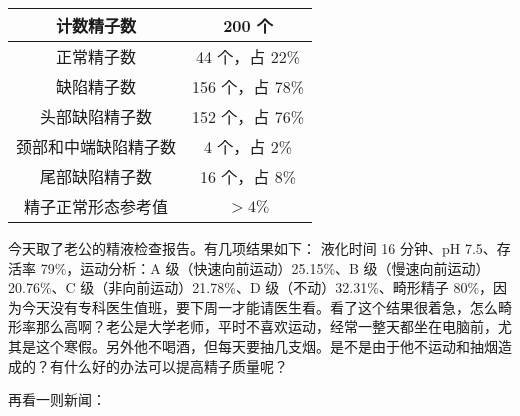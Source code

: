 \begin{case}
\begin{enumerate}
\begin{center}
\begin{tabular}{c|c}
                计数精子数      & 200 个        \\ \hline
                正常精子数      & 44 个，占 22\%  \\ \hline
                缺陷精子数      & 156 个，占 78\% \\ \hline
                头部缺陷精子数    & 152 个，占 76\% \\ \hline
                颈部和中端缺陷精子数 & 4 个，占 2\%    \\ \hline
                尾部缺陷精子数    & 16 个，占 8\%   \\ \hline
                精子正常形态参考值  & $> 4 \%$
            \end{tabular}
        \end{center}
    \end{enumerate}
\end{case}

\begin{case}
    今天取了老公的精液检查报告。有几项结果如下： 液化时间 16 分钟、pH 7.5、存活率 79\%，运动分析：A 级（快速向前运动）25.15\%、B 级（慢速向前运动）20.76\%、C 级（非向前运动）21.78\%、D 级（不动）32.31\%、畸形精子 80\%，因为今天没有专科医生值班，要下周一才能请医生看。看了这个结果很着急，怎么畸形率那么高啊？老公是大学老师，平时不喜欢运动，经常一整天都坐在电脑前，尤其是这个寒假。另外他不喝酒，但每天要抽几支烟。是不是由于他不运动和抽烟造成的？有什么好的办法可以提高精子质量呢？
\end{case}

再看一则新闻：

